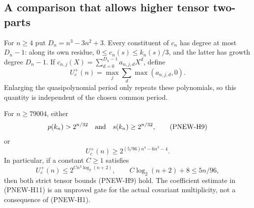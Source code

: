 \subsection*{A comparison that allows higher tensor two-parts}

For $n\ge4$ put $D_n=n^3-3n^2+3$. Every constituent of $c_n$ has
degree at most $D_n-1$: along its own residue, $0\le c_n(s)\le k_n(s)/3$,
and the latter has growth degree $D_n-1$. If
$c_{n,j}(X)=\sum_{d=0}^{D_n-1}a_{n,j,d}X^d$, define
\[
 U_c^+(n)=\max_j\sum_d\max(a_{n,j,d},0).
                                                        \tag{PNEW-H8}
\]
Enlarging the quasipolynomial period only repeats these polynomials,
so this quantity is independent of the chosen common period.

\begin{theorem}
For $n\ge79004$, either
\[
       p(k_n)>2^{n/32}\quad\hbox{and}\quad
       s(k_n)\ge2^{n/32},
                                                        \tag{PNEW-H9}
\]
or
\[
       U_c^+(n)\ge2^{(5/96)n^4-6n^3-4}.
                                                        \tag{PNEW-H10}
\]
In particular, if a constant $C\ge1$ satisfies
\[
 U_c^+(n)\le2^{C n^3\log_2(n+2)},\qquad
 C\log_2(n+2)+8\le5n/96,                              \tag{PNEW-H11}
\]
then both strict tensor bounds (PNEW-H9) hold. The coefficient
estimate in (PNEW-H11) is an unproved gate for the actual covariant
multiplicity, not a consequence of (PNEW-H1).
\end{theorem}
